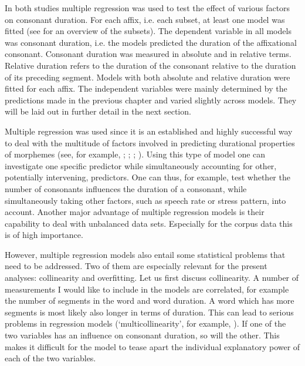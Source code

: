 
In both studies multiple regression was used to test the effect of various factors on consonant duration. For each affix, i.e. each subset, at least one model was fitted (see  for an overview of the subsets). The dependent variable in all models was consonant duration, i.e. the models predicted the duration of the affixational consonant. Consonant duration was measured in absolute and in relative terms. Relative duration refers to the duration of the consonant relative to the duration of its preceding segment. Models with both absolute and relative duration were fitted for each affix.
The independent variables were mainly determined by the predictions made in the previous chapter and varied slightly across models. They will be laid out in further detail in the next section.

Multiple regression was used since it is an established and highly successful way to deal with the multitude of factors involved in predicting durational properties of morphemes (see, for example, \citealt{Hay.2007}; \citealt{Hanique.2012}; \citealt{Smith.2012}; \citealt{Plag.2017}). Using this type of model one can investigate one specific predictor while simultaneously accounting for other, potentially intervening, predictors. One can thus, for example, test whether the number of consonants influences the duration of a consonant, while simultaneously taking other factors, such as speech rate or stress pattern, into account.  Another major advantage of multiple regression models is their capability to deal with unbalanced data sets. Especially for the corpus data this is of high importance. 

However, multiple regression models also entail some statistical problems that need to be addressed. Two of them are especially relevant for the present analyses: collinearity and overfitting. Let us first discuss collinearity.
A number of measurements I would like to include in the models are correlated, for example the number of segments in the word and word duration. A word which has more segments is most likely also longer in terms of duration. This can lead to serious problems in regression models (`multicollinearity', for example, \citealt[chapter 6]{Baayen.2008}).  If one of the two variables has an influence on consonant duration, so will the other. This makes it difficult for the model to tease apart the individual explanatory power of each of the two variables. 

